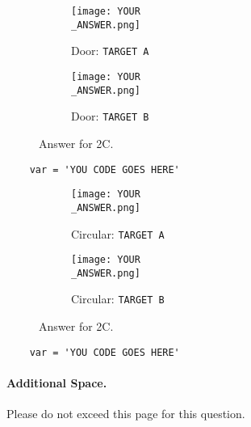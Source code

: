 \newpage
\begin{figure}[hb!]
     \centering
    \begin{subfigure}[b]{0.3\textwidth}
        \texttt{[image: YOUR\\\_ANSWER.png]}
         \caption*{Door: \texttt{TARGET A}}
     \end{subfigure}
     \hfill
     \begin{subfigure}[b]{0.3\textwidth}
        \texttt{[image: YOUR\\\_ANSWER.png]}
         \caption*{Door: \texttt{TARGET B}}
     \end{subfigure}
    \caption*{Answer for 2C.}
\end{figure}
%
\begin{verbatim}
    var = 'YOU CODE GOES HERE'
\end{verbatim}

\newpage
\begin{figure}[hb!]
     \centering
    \begin{subfigure}[b]{0.3\textwidth}
        \texttt{[image: YOUR\\\_ANSWER.png]}
         \caption*{Circular: \texttt{TARGET A}}
     \end{subfigure}
     \hfill
     \begin{subfigure}[b]{0.3\textwidth}
        \texttt{[image: YOUR\\\_ANSWER.png]}
         \caption*{Circular: \texttt{TARGET B}}
     \end{subfigure}
    \caption*{Answer for 2C.}
\end{figure}
%
\begin{verbatim}
    var = 'YOU CODE GOES HERE'
\end{verbatim}

\newpage

\paragraph{Additional Space.}
Please do not exceed this page for this question.
